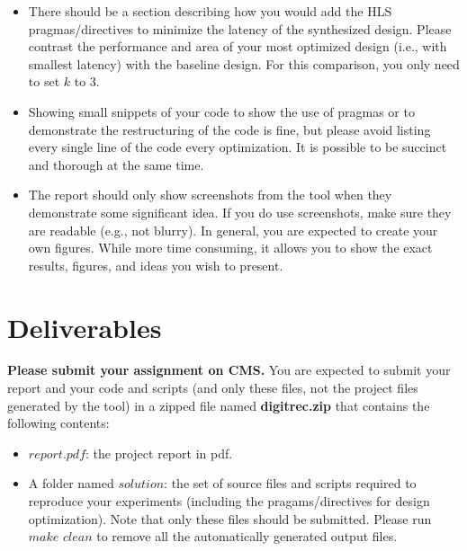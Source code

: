 \documentclass[paper=letter, fontsize=10pt]{scrartcl} %
\numberwithin{equation}{section} %
\numberwithin{figure}{section} %
\numberwithin{table}{section} %
\begin{document}
\begin{itemize}
\item There should be a section describing how you would add the HLS pragmas/directives to minimize the latency of the synthesized design. Please contrast the performance and area of your most optimized design (i.e., with smallest latency) with the baseline design. For this comparison, you only need to set $k$ to 3. 



\item Showing small snippets of your code to show the use of pragmas or to demonstrate the restructuring of the code is fine, but please avoid listing every single line of the code every optimization. It is possible to be succinct and thorough at the same time.

\item The report should only show screenshots from the tool when they demonstrate some significant idea. If you do use screenshots, make sure they are readable (e.g., not blurry). In general, you are expected to create your own figures. While more time consuming, it allows you to show the exact results, figures, and ideas you wish to present.

\end{itemize}

\section{Deliverables}
\label{deliverables}
\textbf{Please submit your assignment on CMS.} You are expected to submit your report and your code and scripts (and only these files, not the project files generated by the tool) in a zipped file named \textbf{digitrec.zip} that contains the following contents:
\begin{itemize}
	\item $report.pdf$: the project report in pdf.
    \item A folder named $solution$: the set of source files and scripts required to reproduce your experiments (including the pragams/directives for design optimization).  
    Note that only these files should be submitted. Please run $make$ $clean$ to remove all the automatically generated output files. 
\end{itemize}
\end{document}
